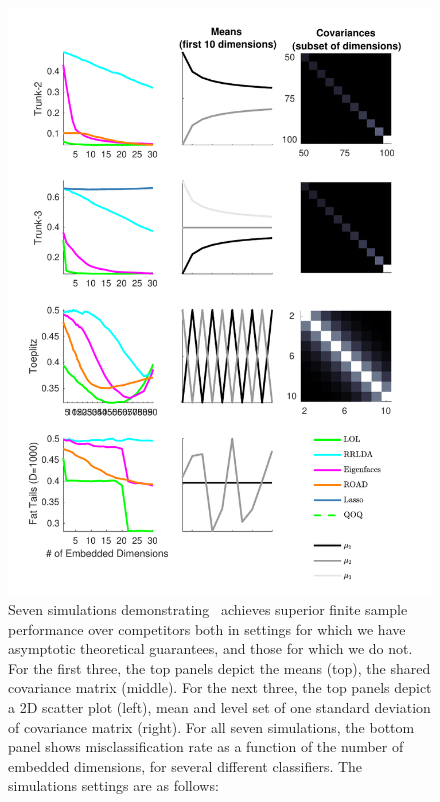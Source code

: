 \documentclass[10pt]{article}
\begin{document}
%





\begin{figure}[h!]
\centering
\includegraphics[width=0.8\linewidth]{../Figs/plot_sims}
\caption{
Seven simulations demonstrating \Lol~achieves superior finite sample performance over competitors both in settings for which we have asymptotic theoretical guarantees, and those for which we do not.
For the first three, the top panels depict the means (top), the shared covariance matrix (middle).  For the next three, the top panels depict a 2D scatter plot (left), mean and level set of one standard deviation of covariance matrix (right).  For all seven simulations, the bottom panel shows misclassification rate as a function of the number of embedded dimensions, for several different classifiers.  The simulations settings are as follows:
}
\end{figure}
\end{document}
